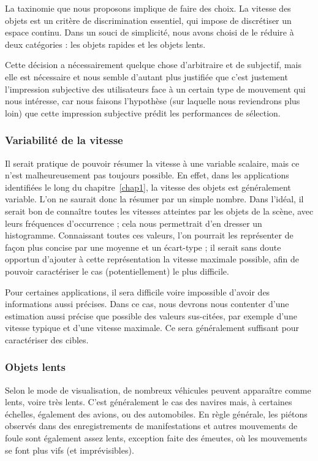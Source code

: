 	La taxinomie que nous proposons implique de faire des choix. La vitesse des objets est un critère de discrimination essentiel, qui impose de discrétiser un espace continu. Dans un souci de simplicité, nous avons choisi de le réduire à deux catégories : les objets rapides et les objets lents.
	
	Cette décision a nécessairement quelque chose d'arbitraire et de subjectif, mais elle est nécessaire et nous semble d'autant plus justifiée que c'est justement l'impression subjective des utilisateurs face à un certain type de mouvement qui nous intéresse, car nous faisons l'hypothèse (sur laquelle nous reviendrons plus loin) que cette impression subjective prédit les performances de sélection.
	
	\FloatBarrier \subsubsection{Variabilité de la vitesse}
	Il serait pratique de pouvoir résumer la vitesse à une variable scalaire, mais ce n'est malheureusement pas toujours possible. En effet, dans les applications identifiées le long du chapitre~\ref{chap1}, la vitesse des objets est généralement variable. L'on ne saurait donc la résumer par un simple nombre. Dans l'idéal, il serait bon de connaître toutes les vitesses atteintes par les objets de la scène, avec leurs fréquences d'occurrence ; cela nous permettrait d'en dresser un histogramme. Connaissant toutes ces valeurs, l'on pourrait les représenter de façon plus concise par une moyenne et un écart-type ; il serait sans doute opportun d'ajouter à cette représentation la vitesse maximale possible, afin de pouvoir caractériser le cas (potentiellement) le plus difficile.
	
	Pour certaines applications, il sera difficile voire impossible d'avoir des informations aussi précises. Dans ce cas, nous devrons nous contenter d'une estimation aussi précise que possible des valeurs sus-citées, par exemple d'une vitesse \og typique \fg{} et d'une vitesse maximale. Ce sera généralement suffisant pour caractériser des cibles.
				
	\FloatBarrier \subsubsection{Objets lents}
	Selon le mode de visualisation, de nombreux véhicules peuvent apparaître comme lents, voire très lents. C'est généralement le cas des navires mais, à certaines échelles, également des avions, ou des automobiles. En règle générale, les piétons observés dans des enregistrements de manifestations et autres mouvements de foule sont également assez lents, exception faite des émeutes, où les mouvements se font plus vifs (et imprévisibles).
	
